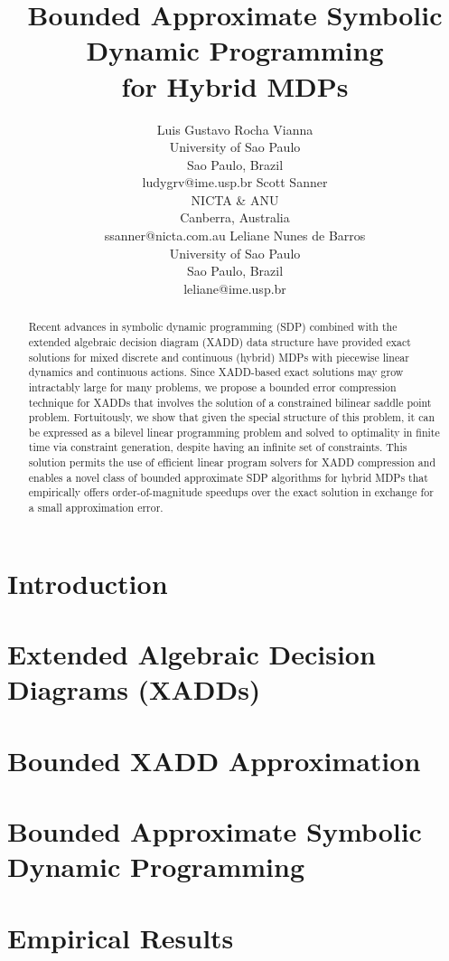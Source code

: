 \documentclass[]{article}
\title{	Bounded Approximate Symbolic Dynamic Programming\\ for Hybrid MDPs }
\author{Luis Gustavo Rocha Vianna\\ 
University of Sao Paulo\\
Sao Paulo, Brazil\\
ludygrv@ime.usp.br
\And
Scott Sanner\\
NICTA \& ANU\\
Canberra, Australia\\
ssanner@nicta.com.au
\And
Leliane Nunes de Barros\\
University of Sao Paulo\\
Sao Paulo, Brazil\\
leliane@ime.usp.br}
\begin{document}
\maketitle

\begin{abstract}
Recent advances in symbolic dynamic programming (SDP) combined with
the extended algebraic decision diagram (XADD) data structure have
provided exact solutions for mixed discrete and continuous (hybrid)
MDPs with piecewise linear dynamics and continuous actions.  Since
XADD-based exact solutions may grow intractably large for many
problems, we propose a bounded error compression technique for XADDs
that involves the solution of a constrained bilinear saddle point
problem.  Fortuitously, we show that given the special structure of
this problem, it can be expressed as a bilevel linear programming
problem and solved to optimality in finite time via constraint
generation, despite having an infinite set of constraints.  This
solution permits the use of efficient linear program solvers for XADD
compression and enables a novel class of bounded approximate SDP
algorithms for hybrid MDPs that empirically offers order-of-magnitude
speedups over the exact solution in exchange for a small approximation
error.
\end{abstract}

\section{Introduction}



\section{Extended Algebraic Decision Diagrams (XADDs)}



\section{Bounded XADD Approximation}



\section{Bounded Approximate Symbolic Dynamic Programming}



\section{Empirical Results}
\end{document}
